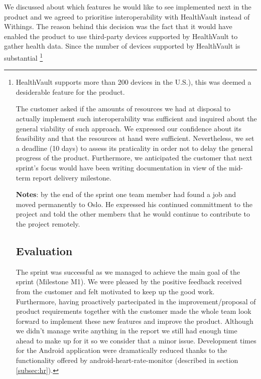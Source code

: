 We discussed about which features he would like to see implemented next in the product
and we agreed to prioritise interoperability with HealthVault instead of Withings.
The reason behind this decision was the fact that it would have enabled
the product to use third-party devices supported by HealthVault to gather health data.
Since the number of devices supported by HealthVault is substantial
\footnote{HealthVault supports more than 200 devices in the U.S.), this was deemed a desiderable feature for the product.

The customer asked if the amounts of resources we had at disposal to actually implement
such interoperability was sufficient and inquired about the general viability of such approach.
We expressed our confidence about its feasibility and that the resources at hand were sufficient.
Nevertheless, we set a deadline (10 days) to assess its praticality in order not to delay
the general progress of the product.
Furthermore, we anticipated the customer that next sprint's focus would have been writing documentation
in view of the mid-term report delivery milestone.

\textbf{Notes}: by the end of the sprint one team member had found a job and moved permanently to Oslo.
He expressed his continued committment to the project and told the other members that he would continue
to contribute to the project remotely.

\section{Evaluation}

The sprint was successful as we managed to achieve the main goal of the sprint (Milestone M1).
We were pleased by the positive feedback received from the customer and felt motivated to
keep up the good work. Furthermore, having proactively partecipated in the improvement/proposal
of product requirements together with the customer made the whole team look forward to implement these new
features and improve the product. Although we didn't manage write anything in the report we still had enough
time ahead to make up for it so we consider that a minor issue.
Development times for the Android application were dramatically reduced thanks to the functionality
offered by android-heart-rate-monitor (described in section \ref{subsec:hr}).

}
